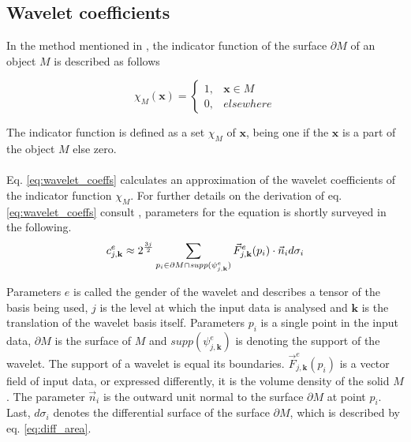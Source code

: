 \subsection{Wavelet coefficients} 
In the method mentioned in \cite{Manson2008}, the indicator function of the surface $\partial M$ of an object $M$ is described as follows

\begin{equation}
	\chi_M(\textbf{x}) = 
	\begin{cases}
	1, & \textbf{x} \in M\\
	0, & elsewhere
	\end{cases} 
	\label{eq:indicator_fnc}
\end{equation}

\noindent The indicator function is defined as a set $\chi_M$ of $\textbf{x}$, being one if the $\textbf{x}$ is a part of the object $M$ else zero.\\
\\
Eq. \ref{eq:wavelet_coeffs} calculates an approximation of the wavelet coefficients of the indicator function $\chi_M$. For further details on the derivation of eq. \ref{eq:wavelet_coeffs} consult \cite{Manson2008}, parameters for the equation is shortly surveyed in the following.\\

\begin{equation}
	c^e_{j,\textbf{k}} \approx 2^{3j \over 2} \sum_{p_i \in \partial M \cap \textit{supp}(\psi^e_{j,\textbf{k}})} \vec{F}^e_{j,\textbf{k}} (p_i) \cdot \vec{n}_i d \sigma_i 
	\label{eq:wavelet_coeffs}
\end{equation}

\noindent Parameters $e$ is called the gender of the wavelet and describes a tensor of the basis being used, $j$ is the level at which the input data is analysed and $\textbf{k}$ is the translation of the wavelet basis itself. Parameters $p_i$ is a single point in the input data, $\partial M$ is the surface of $M$ and $\textit{supp}(\psi^e_{j,\textbf{k}})$ is denoting the support of the wavelet. The support of a wavelet is equal its boundaries. $\vec{F}^e_{j,\textbf{k}} (p_i)$ is a vector field of input data, or expressed differently, it is the volume density of the solid $M$. The parameter $\vec{n}_i$ is the outward unit normal to the surface $\partial M$ at point $p_i$. Last, $d \sigma_i$ denotes the differential surface of the surface $\partial M$, which is described by eq. \ref{eq:diff_area}.

